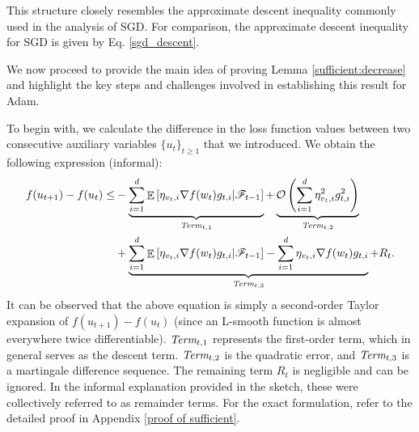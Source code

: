 \documentclass{article} %
\DeclareMathOperator{\Expect}{\mathbb{E}}
\begin{document}
This structure closely resembles the approximate descent inequality commonly used in the analysis of SGD. For comparison, the approximate descent inequality for SGD is given by Eq. \ref{sgd_descent}.

We now proceed to provide the main idea of proving Lemma \ref{sufficient:decrease} and highlight the key steps and challenges involved in establishing this result for Adam.

To begin with, we calculate the difference in the loss function values between two consecutive auxiliary variables $\{u_{t}\}_{t \geq 1}$ that we introduced. We obtain the following expression (informal):
\begin{align}\label{informal}
    f(u_{t+1})-f(u_{t})\le & -\underbrace{\sum_{i=1}^{d}\Expect\left[\eta_{v_{t},i}\nabla f(w_{t})g_{t,i}|\mathscr{F}_{t-1}\right]}_{\emph{Term}_{t,1}}+\underbrace{\mathcal{O}\left(\sum_{i=1}^{d}\eta_{v_{t},i}^{2}g_{t,i}^{2}\right)}_{\emph{Term}_{t,2}}\notag\\&+\underbrace{\sum_{i=1}^{d}\Expect\left[\eta_{v_{t},i}\nabla f(w_{t})g_{t,i}|\mathscr{F}_{t-1}\right]-\sum_{i=1}^{d}\eta_{v_{t},i}\nabla f(w_{t})g_{t,i}}_{\emph{Term}_{t,3}}+R_{t}.
\end{align}
It can be observed that the above equation is simply a second-order Taylor expansion of $f(u_{t+1}) - f(u_{t})$ (since an L-smooth function is almost everywhere twice differentiable). $\emph{Term}_{t,1}$ represents the first-order term, which in general serves as the descent term. $\emph{Term}_{t,2}$ is the quadratic error, and $\emph{Term}_{t,3}$ is a martingale difference sequence. The remaining term $R_{t}$ is negligible and can be ignored. In the informal explanation provided in the sketch, these were collectively referred to as remainder terms. For the exact formulation, refer to the detailed proof in Appendix \ref{proof of sufficient}.
\end{document}
